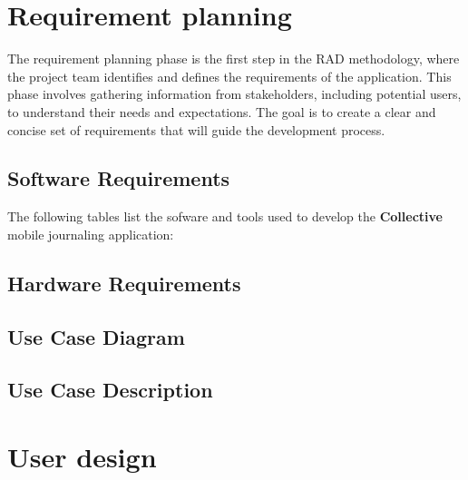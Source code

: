 \section{Requirement planning}\label{sec:requirementPlanning}   

The requirement planning phase is the first step in the RAD methodology, where the project team identifies and defines the requirements of the application. This phase involves gathering information from stakeholders, including potential users, to understand their needs and expectations. The goal is to create a clear and concise set of requirements that will guide the development process.

\subsection{Software Requirements}\label{subsec:softwareRequirements}

The following tables list the sofware and tools used to develop the \textbf{Collective} mobile journaling application:

\subsection{Hardware Requirements}\label{subsec:hardwareRequirements}
\subsection{Use Case Diagram}\label{subsec:usecaseDiagram}
\subsection{Use Case Description}\label{subsec:usecaseDescription}

\section{User design}\label{sec:userDesign}